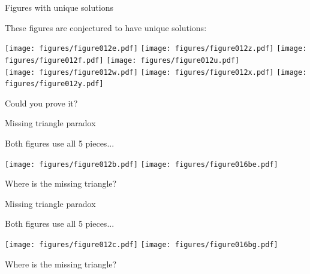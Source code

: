 \documentclass[14pt]{beamer}
\begin{document}
    \begin{frame}{Figures with unique solutions}

        \vspace{-1em}
        \begin{center}
            These figures are conjectured to have unique solutions:

            \bigskip\medskip

            \texttt{[image: figures/figure012e.pdf]}\quad
            \texttt{[image: figures/figure012z.pdf]}\quad
            \texttt{[image: figures/figure012f.pdf]}\quad
            \texttt{[image: figures/figure012u.pdf]} \\[3ex]
            \texttt{[image: figures/figure012w.pdf]}\quad
            \texttt{[image: figures/figure012x.pdf]}\quad
            \texttt{[image: figures/figure012y.pdf]} \\

            \bigskip\medskip
            
            Could you prove it?
        \end{center}
    \end{frame}


    \begin{frame}{Missing triangle paradox}
        \begin{center}
            Both figures use all 5 pieces...

            \vspace{36pt}

            \;\;\texttt{[image: figures/figure012b.pdf]}\qquad
            \qquad
            \texttt{[image: figures/figure016be.pdf]}\;\;\,

            \vspace{32pt}

            Where is the missing triangle?
        \end{center}
    \end{frame}


    \begin{frame}{Missing triangle paradox}
        \begin{center}
            Both figures use all 5 pieces...

            \vspace{36pt}

            \;\;\texttt{[image: figures/figure012c.pdf]}\qquad
            \qquad
            \texttt{[image: figures/figure016bg.pdf]}\;\;\,

            \vspace{32pt}

            Where is the missing triangle?
        \end{center}
    \end{frame}
\end{document}
